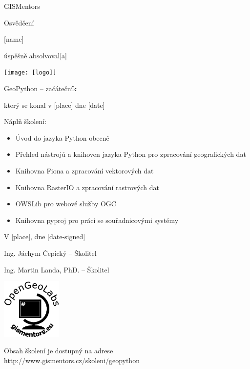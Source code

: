\documentclass[12pt, a4paper]{letter}
\begin{document}
\pagestyle{empty}
\begin{center}

{\Large GISMentors}

{\Huge Osvědčení}

{\Large [name]}

úspěšně absolvoval[a]

\texttt{[image: [logo]]}

{\Large GeoPython -- začátečník}

který se konal v [place] dne [date]
\end{center}

Náplň školení:

\begin{itemize}
    \item Úvod do jazyka Python obecně
    \item Přehled nástrojů a knihoven jazyka Python pro zpracování geografických dat
    \item Knihovna Fiona a zpracování vektorových dat
    \item Knihovna RasterIO a zpracování rastrových dat
    \item OWSLib pro webové služby OGC
    \item Knihovna pyproj pro práci se souřadnicovými systémy
\end{itemize}

\vfill
\parbox{7cm}{

    V [place], dne [date-signed]\\

\vfill

    Ing. Jáchym Čepický -- Školitel \\

\vfill

    Ing. Martin Landa, PhD. -- Školitel
}
\hfill
\parbox{3cm}{
    \includegraphics[width=3cm]{../images/placka.eps}
}

\vfill

\begin{center}
{\footnotesize Obsah školení je dostupný na adrese
http://www.gismentors.cz/skoleni/geopython}
\end{center}
\end{document}
